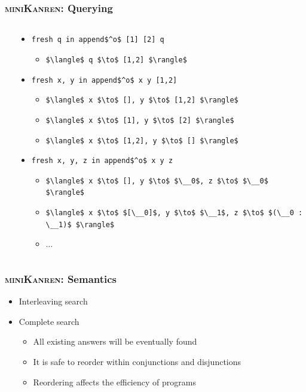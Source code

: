 \documentclass[xcolor=table]{beamer}
\newcommand{\mk}{\textsc{miniKanren}\xspace}
\begin{document}
\begin{frame}[fragile]
  \frametitle{\mk: Querying}
  \begin{columns}
    \begin{column}{0.4\textwidth}
      \begin{center}
        
      \end{center}
    \end{column}
    \begin{column}{0.6\textwidth}
      \begin{itemize}
        \item \lstinline{fresh q in append$^o$ [1] [2] q}
        \begin{itemize}
          \setlength{\itemindent}{-0.6em}
          \item \lstinline{$\langle$ q $\to$ [1,2] $\rangle$}
        \end{itemize}
        \pause
        \item \lstinline{fresh x, y in append$^o$ x y [1,2]}
        \begin{itemize}
          \setlength{\itemindent}{-0.6em}
          \item \lstinline{$\langle$ x $\to$ [], y $\to$ [1,2] $\rangle$}
          \item \lstinline{$\langle$ x $\to$ [1], y $\to$ [2] $\rangle$}
          \item \lstinline{$\langle$ x $\to$ [1,2], y $\to$ [] $\rangle$}
        \end{itemize}
        \pause
        \item \lstinline{fresh x, y, z in append$^o$ x y z}
        \begin{itemize}
          \setlength{\itemindent}{-0.6em}
          \item \lstinline{$\langle$ x $\to$ [], y $\to$ $\__0$, z $\to$ $\__0$ $\rangle$}
          \item \lstinline{$\langle$ x $\to$ $[\__0]$, y $\to$ $\__1$, z $\to$ $(\__0 : \__1)$ $\rangle$}
          \item $\dots$
        \end{itemize}
      \end{itemize}
    \end{column}
  \end{columns}

\end{frame}

\begin{frame}[fragile]
  \frametitle{\mk: Semantics}
  \begin{itemize}
    \item Interleaving search
    \item Complete search
    \begin{itemize}
      \item All existing answers will be eventually found
      \item It is safe to reorder within conjunctions and disjunctions
      \item Reordering affects the efficiency of programs
    \end{itemize}
  \end{itemize}
\end{frame}
\end{document}
